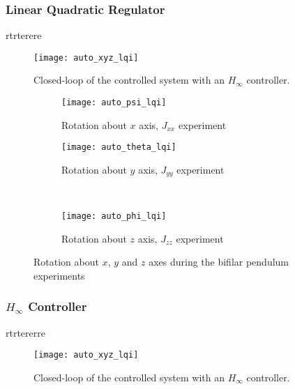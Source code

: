 \subsubsection{Linear Quadratic Regulator}
rtrterere
\begin{figure}[h]
	\begin{center}
	\texttt{[image: auto\_xyz\_lqi]}
	\caption{Closed-loop of the controlled system with an $H_{\infty}$ controller.}
	\label{fig:auto_xyz_lqi}
	\end{center}
	\end{figure}
	
\begin{figure}[H]
\begin{subfigure}{.5\linewidth}
\centering
\texttt{[image: auto\_psi\_lqi]}
\caption{Rotation about $x$ axis, $J_{xx}$ experiment}
\label{fig:auto_psi_lqi}
\end{subfigure}%
\begin{subfigure}{.5\linewidth}
\centering
\texttt{[image: auto\_theta\_lqi]}
\caption{Rotation about $y$ axis, $J_{yy}$ experiment}
\label{fig:auto_theta_lqi}
\end{subfigure}\\[1ex]
\begin{subfigure}{\linewidth}
\centering
\texttt{[image: auto\_phi\_lqi]}
\caption{Rotation about $z$ axis, $J_{zz}$ experiment}
\label{fig:auto_psi_lqi}
\end{subfigure}
\caption{Rotation about $x$, $y$ and $z$ axes during the bifilar pendulum experiments}
\label{fig:auto_lqi}
\end{figure}

\subsubsection{$H_\infty$ Controller}
rtrtererre

\begin{figure}[h]
	\begin{center}
	\texttt{[image: auto\_xyz\_lqi]}
	\caption{Closed-loop of the controlled system with an $H_{\infty}$ controller.}
	\label{fig:auto_xyz_lqi}
	\end{center}
	\end{figure}
	
